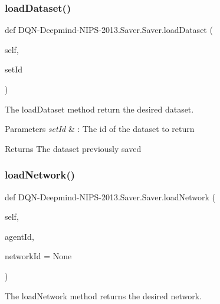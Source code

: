 \subsubsection{\texorpdfstring{load\+Dataset()}{loadDataset()}}
{\footnotesize\ttfamily def D\+QN-\/Deepmind-\/N\+I\+PS-\/2013.Saver.\+Saver.\+load\+Dataset (\begin{DoxyParamCaption}\item[{}]{self,  }\item[{}]{set\+Id }\end{DoxyParamCaption})}



The load\+Dataset method return the desired dataset. 


\begin{DoxyParams}{Parameters}
{\em set\+Id} & \+: The id of the dataset to return\\
\hline
\end{DoxyParams}
\begin{DoxyReturn}{Returns}
The dataset previously saved 
\end{DoxyReturn}
\hypertarget{classDQN-Deepmind-NIPS-2013_1_1Saver_1_1Saver_a90f2e74db8a2b69b94959945ffb896f6}{}\label{classDQN-Deepmind-NIPS-2013_1_1Saver_1_1Saver_a90f2e74db8a2b69b94959945ffb896f6} 
\subsubsection{\texorpdfstring{load\+Network()}{loadNetwork()}}
{\footnotesize\ttfamily def D\+QN-\/Deepmind-\/N\+I\+PS-\/2013.Saver.\+Saver.\+load\+Network (\begin{DoxyParamCaption}\item[{}]{self,  }\item[{}]{agent\+Id,  }\item[{}]{network\+Id = {\ttfamily None} }\end{DoxyParamCaption})}



The load\+Network method returns the desired network. 


